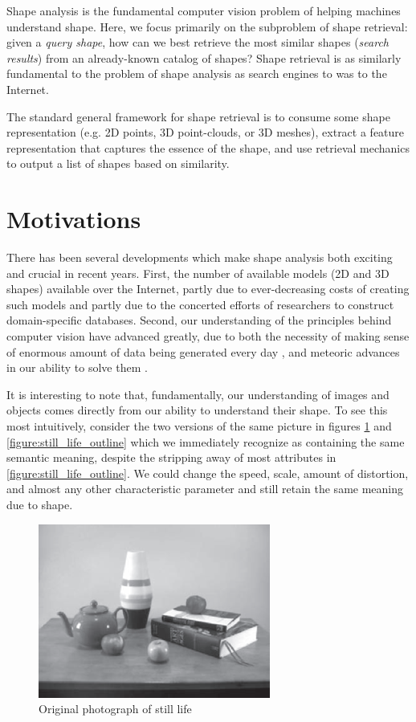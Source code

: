 \documentclass[../tech_report_1.tex]{subfiles}
\begin{document}
Shape analysis is the fundamental computer vision problem of helping machines understand shape. Here, we focus primarily on the subproblem of shape retrieval: given a \textit{query shape}, how can we best retrieve the most similar shapes (\textit{search results}) from an already-known catalog of shapes? Shape retrieval is as similarly fundamental to the problem of shape analysis as search engines to was to the Internet.

The standard general framework for shape retrieval is to consume some shape representation (e.g. 2D points, 3D point-clouds, or 3D meshes), extract a feature representation that captures the essence of the shape, and use retrieval mechanics to output a list of shapes based on similarity.

\section{Motivations}

There has been several developments which make shape analysis both exciting and crucial in recent years. First, the number of available models (2D and 3D shapes) available over the Internet, partly due to ever-decreasing costs of creating such models and partly due to the concerted efforts of researchers to construct domain-specific databases. Second, our understanding of the principles behind computer vision have advanced greatly, due to both the necessity of making sense of enormous amount of data being generated every day \cite{manyika2011big}, and meteoric advances in our ability to solve them \cite{krizhevsky2012imagenet}.

It is interesting to note that, fundamentally, our understanding of images and objects comes directly from our ability to understand their shape. To see this most intuitively, consider the two versions of the same picture in figures \ref{figure:still_life_original} and \ref{figure:still_life_outline} which we immediately recognize as containing the same semantic meaning, despite the stripping away of most attributes in \ref{figure:still_life_outline}. We could change the speed, scale, amount of distortion, and almost any other characteristic parameter and still retain the same meaning due to shape.

\begin{figure}[H]
	\centering
	\includegraphics{still_life_full}
	\caption{Original photograph of still life\label{figure:still_life_original}}
\end{figure}
\end{document}
